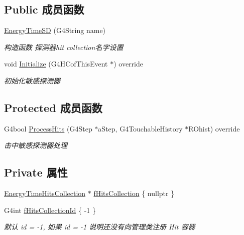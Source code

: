\subsection*{Public 成员函数}
\begin{DoxyCompactItemize}
\item 
\hyperlink{classEnergyTimeSD_a501274766adbbe35de4e8f307ed5b411}{Energy\+Time\+SD} (G4\+String name)
\begin{DoxyCompactList}\small\item\em 构造函数 探测器hit collection名字设置 \end{DoxyCompactList}\item 
void \hyperlink{classEnergyTimeSD_a81809ac7ecdc9eb7bcdc00d489cb9fb3}{Initialize} (G4\+H\+Cof\+This\+Event $\ast$) override
\begin{DoxyCompactList}\small\item\em 初始化敏感探测器 \end{DoxyCompactList}\end{DoxyCompactItemize}
\subsection*{Protected 成员函数}
\begin{DoxyCompactItemize}
\item 
G4bool \hyperlink{classEnergyTimeSD_a24131df6ca564ef0a71e49c4625d5477}{Process\+Hits} (G4\+Step $\ast$a\+Step, G4\+Touchable\+History $\ast$R\+Ohist) override
\begin{DoxyCompactList}\small\item\em 击中敏感探测器处理 \end{DoxyCompactList}\end{DoxyCompactItemize}
\subsection*{Private 属性}
\begin{DoxyCompactItemize}
\item 
\hyperlink{EnergyTimeHit_8hh_a16746facffb48be663356f32939fd35f}{Energy\+Time\+Hits\+Collection} $\ast$ \hyperlink{classEnergyTimeSD_a06ebf7e427ea561ac4d8ddbe761c4410}{f\+Hits\+Collection} \{ nullptr \}
\item 
G4int \hyperlink{classEnergyTimeSD_ad137fb0e308e260e9eb18378cd325a7d}{f\+Hits\+Collection\+Id} \{ -\/1 \}
\begin{DoxyCompactList}\small\item\em 默认 id = -\/1, 如果 id = -\/1 说明还没有向管理类注册 Hit 容器 \end{DoxyCompactList}\end{DoxyCompactItemize}


